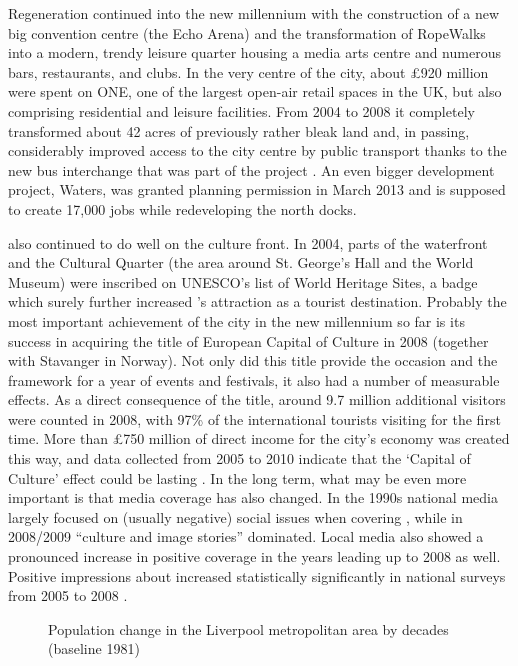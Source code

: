 Regeneration continued into the new millennium with the construction of a new big convention centre (the Echo Arena) and the transformation of RopeWalks into a modern, trendy leisure quarter housing a media arts centre and numerous bars, restaurants, and clubs.
In the very centre of the city, about £920 million were spent on  ONE, one of the largest open-air retail spaces in the UK, but also comprising residential and leisure facilities.
From 2004 to 2008 it completely transformed about 42 acres of previously rather bleak land and, in passing, considerably improved access to the city centre by public transport thanks to the new bus interchange that was part of the project \parencite[cf.][478--479]{murden2006}.
An even bigger development project,  Waters, was granted planning permission in March 2013 and is supposed to create 17,000 jobs while redeveloping the north docks.

 also continued to do well on the culture front.
In 2004, parts of the waterfront and the Cultural Quarter (the area around St. George's Hall and the World Museum) were inscribed on UNESCO's list of World Heritage Sites, a badge which surely further increased 's attraction as a tourist destination.
Probably the most important achievement of the city in the new millennium so far is its success in acquiring the title of European Capital of Culture in 2008 (together with Stavanger in Norway).
Not only did this title provide the occasion and the framework for a year of events and festivals, it also had a number of measurable effects.
As a direct consequence of the title, around 9.7 million additional visitors were counted in 2008, with 97\% of the international tourists visiting for the first time.
More than £750 million of direct income for the city's economy was created this way, and data collected from 2005 to 2010 indicate that the `Capital of Culture' effect could be lasting \parencite{garciaetal2010}.
In the long term, what may be even more important is that media coverage has also changed.
In the 1990s national media largely focused on (usually negative) social issues when covering , while in 2008/2009 ``culture and image stories'' dominated.
Local media also showed a pronounced increase in positive coverage in the years leading up to 2008 as well.
Positive impressions about  increased statistically significantly in national surveys from 2005 to 2008 \citep[cf.][25 and 44--46]{garciaetal2010}.

	\begin{figure}[h]
		\centering
		
		\caption[Population change in the {Liverpool} area]{Population change in the {Liverpool} metropolitan area by decades (baseline 1981)}
		\label{fig.population}
	\end{figure}

